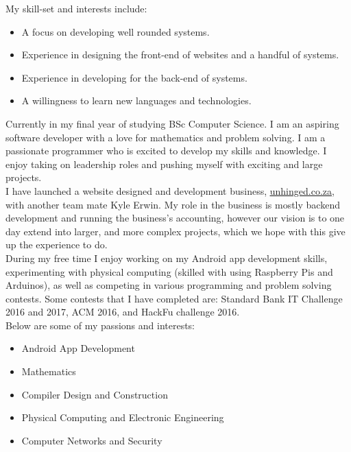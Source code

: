 My skill-set and interests include:
\begin{itemize}

        \item A focus on developing well rounded systems.
        
        \item Experience in designing the front-end of websites and a handful of systems.
        
        \item Experience in developing for the back-end of systems.
        
        \item A willingness to learn new languages and technologies.
        
    \end{itemize}

%
%
\newpage
{}
    Currently in my final year of studying BSc Computer Science. I am an aspiring software developer with a love for mathematics and problem solving. I am a passionate programmer who is excited to develop my skills and knowledge. I enjoy taking on leadership roles and pushing myself with exciting and large projects. \\

    I have launched a website designed and development business, \href{www.unhinged.co.za}{\underline{unhinged.co.za}}, with another team mate Kyle Erwin. My role in the business is mostly backend development and running the business's accounting, however our vision is to one day extend into larger, and more complex projects, which we hope with this give up the experience to do.\\

    During my free time I enjoy working on my Android app development skills, experimenting with physical computing (skilled with using Raspberry Pis and Arduinos), as well as competing in various programming and problem solving contests. Some contests that I have completed are: Standard Bank IT Challenge 2016 and 2017, ACM 2016, and HackFu challenge 2016.\\

    \noindent
    Below are some of my passions and interests:
    \begin{itemize}
        \item Android App Development
        \item Mathematics
        \item Compiler Design and Construction
        \item Physical Computing and Electronic Engineering
        \item Computer Networks and Security
    \end{itemize}
